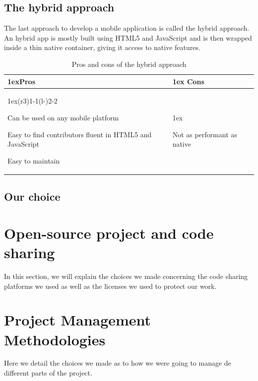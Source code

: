 \documentclass[11pt, a4paper]{report}
\begin{document}
\subsection{The hybrid approach}

The last approach to develop a mobile application is called the hybrid approach. An hybrid app is mostly built using HTML5 and JavaScript and is then wrapped inside a thin native container, giving it access to native features.

\begin{table}[H]
\begin{tabularx}{\linewidth}{>{\parskip1ex}X@{\kern4\tabcolsep}>{\parskip1ex}X}
\toprule
\hfil\bfseries Pros
&
\hfil\bfseries Cons
\\\cmidrule(r{3\tabcolsep}){1-1}\cmidrule(l{-\tabcolsep}){2-2}

Can be used on any mobile platform\par
Easy to find contributors fluent in HTML5 and JavaScript\par
Easy to maintain\par

&

Not as performant as native\par



\\\bottomrule
\end{tabularx}
\caption{Pros and cons of the hybrid approach}
\end{table}

\subsection{Our choice}

\section{Open-source project and code sharing}

In this section, we will explain the choices we made concerning the code sharing platforms we used as well as the licenses we used to protect our work.

\section{Project Management Methodologies}

Here we detail the choices we made as to how we were going to manage de different parts of the project.
\end{document}

